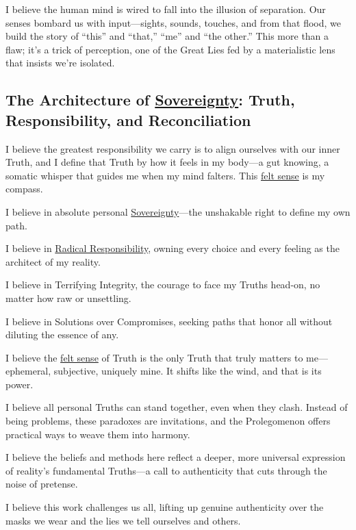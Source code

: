 \documentclass{article}
\begin{document}
I believe the human mind is wired to fall into the illusion of separation. Our senses bombard us with input—sights, sounds, touches, and from that flood, we build the story of “this” and “that,” “me” and “the other.” This more than a flaw; it's a trick of perception, one of the Great Lies fed by a materialistic lens that insists we're isolated.

\subsection*{The Architecture of \hyperlink{gloss:sovereignty}{Sovereignty}: Truth, Responsibility, and Reconciliation}

I believe the greatest responsibility we carry is to align ourselves with our inner Truth, and I define that Truth by how it feels in my body—a gut knowing, a somatic whisper that guides me when my mind falters. This \hyperlink{gloss:felt_sense}{felt sense} is my compass.

I believe in absolute personal \hyperlink{gloss:sovereignty}{Sovereignty}—the unshakable right to define my own path.

I believe in \hyperlink{gloss:radical_responsibility}{Radical Responsibility}, owning every choice and every feeling as the architect of my reality.

I believe in Terrifying Integrity, the courage to face my Truths head-on, no matter how raw or unsettling.

I believe in Solutions over Compromises, seeking paths that honor all without diluting the essence of any.

I believe the \hyperlink{gloss:felt_sense}{felt sense} of Truth is the only Truth that truly matters to me—ephemeral, subjective, uniquely mine. It shifts like the wind, and that is its power.

I believe all personal Truths can stand together, even when they clash. Instead of being problems, these paradoxes are invitations, and the Prolegomenon offers practical ways to weave them into harmony.

I believe the beliefs and methods here reflect a deeper, more universal expression of reality's fundamental Truths—a call to authenticity that cuts through the noise of pretense.

I believe this work challenges us all, lifting up genuine authenticity over the masks we wear and the lies we tell ourselves and others.
\end{document}
